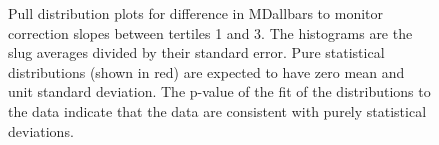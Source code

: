 \begin{figure}[ht]

\centering
{}
\caption{Pull distribution plots for difference in MDallbars to monitor correction slopes between tertiles 1 and 3. The histograms are the slug averages divided by their standard error. Pure statistical distributions (shown in red) are expected to have zero mean and unit standard deviation. The p-value of the fit of the distributions to the data indicate that the data are consistent with purely statistical deviations.}
\label{fig:tert_mdall_pull_plots}
\end{figure}

